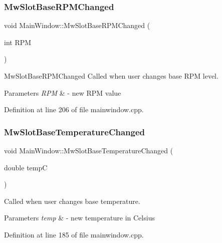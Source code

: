 \subsubsection{\texorpdfstring{Mw\+Slot\+Base\+R\+P\+M\+Changed}{MwSlotBaseRPMChanged}}
{\footnotesize\ttfamily void Main\+Window\+::\+Mw\+Slot\+Base\+R\+P\+M\+Changed (\begin{DoxyParamCaption}\item[{int}]{R\+PM }\end{DoxyParamCaption})\hspace{0.3cm}{\ttfamily [slot]}}



Mw\+Slot\+Base\+R\+P\+M\+Changed Called when user changes base R\+PM level. 


\begin{DoxyParams}{Parameters}
{\em R\+PM} & -\/ new R\+PM value \\
\hline
\end{DoxyParams}


Definition at line 206 of file mainwindow.\+cpp.

\mbox{\label{class_main_window_a0a690287dffb47b6477f2fb50c2a818e}} 
\subsubsection{\texorpdfstring{Mw\+Slot\+Base\+Temperature\+Changed}{MwSlotBaseTemperatureChanged}}
{\footnotesize\ttfamily void Main\+Window\+::\+Mw\+Slot\+Base\+Temperature\+Changed (\begin{DoxyParamCaption}\item[{double}]{tempC }\end{DoxyParamCaption})\hspace{0.3cm}{\ttfamily [slot]}}



Called when user changes base temperature. 


\begin{DoxyParams}{Parameters}
{\em temp} & -\/ new temperature in Celsius \\
\hline
\end{DoxyParams}


Definition at line 185 of file mainwindow.\+cpp.

